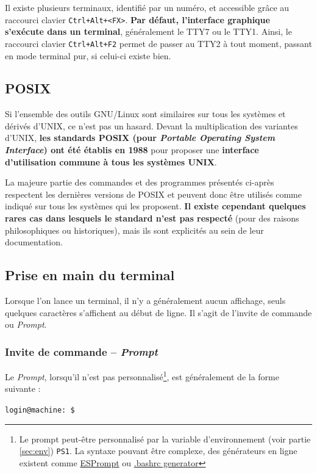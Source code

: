 Il existe plusieurs terminaux, identifié par un numéro, et accessible grâce au raccourci clavier \texttt{Ctrl+Alt+<FX>}. \textbf{Par défaut, l'interface graphique s'exécute dans un terminal}, généralement le TTY7 ou le TTY1. Ainsi, le raccourci clavier \texttt{Ctrl+Alt+F2} permet de passer au TTY2 à tout moment, passant en mode terminal pur, si celui-ci existe bien.

\vspace{-3mm}
\subsection{POSIX} \label{sec:POSIX}
\vspace{-3mm}
Si l'ensemble des outils GNU/Linux sont similaires sur tous les systèmes et dérivés d'UNIX, ce n'est pas un hasard. Devant la multiplication des variantes d'UNIX, \textbf{les standards POSIX (pour \textit{Portable Operating System Interface}) ont été établis en 1988} pour proposer une \textbf{interface d'utilisation commune à tous les systèmes UNIX}.

La majeure partie des commandes et des programmes présentés ci-après respectent les dernières versions de  POSIX et peuvent donc être utilisés comme indiqué sur tous les systèmes qui les proposent. \textbf{Il existe cependant quelques rares cas dans lesquels le standard n'est pas respecté} (pour des raisons philosophiques ou historiques), mais ils sont explicités au sein de leur documentation.
\newpage

\subsection{Prise en main du terminal}
\vspace{-4mm}
Lorsque l'on lance un terminal, il n'y a généralement aucun affichage, seuls quelques caractères s'affichent au début de ligne. Il s'agit de l'invite de commande ou \textit{Prompt}.
\subsubsection{Invite de commande -- \textit{Prompt}}

Le \textit{Prompt}, lorsqu'il n'est pas personnalisé\footnote{Le prompt peut-être personnalisé par la variable d'environnement (voir partie \ref{sec:env}) \texttt{PS1}. La syntaxe pouvant être complexe, des générateurs en ligne existent comme \href{http://ezprompt.net}{ESPrompt} ou \href{http://bashrcgenerator.com}{.bashrc generator}}, est généralement de la forme suivante :
\begin{nscenter}
    \texttt{login@machine:\tilde~\$}
\end{nscenter}

